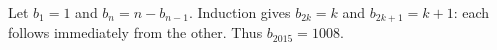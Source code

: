 Let $b_1=1$ and $b_n=n-b_{n-1}$. Induction gives $b_{2k}=k$ and $b_{2k+1}=k+1$: each follows immediately from the other. Thus $b_{2015}=\boxed{1008}$.
